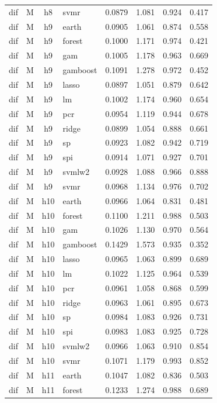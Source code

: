 \begin{ThreePartTable}
\begin{longtable}[t]{llclcccc}
dif & M & h8 & svmr & 0.0879 & 1.081 & 0.924 & 0.417\\
\addlinespace
dif & M & h9 & earth & 0.0905 & 1.061 & 0.874 & 0.558\\
dif & M & h9 & forest & 0.1000 & 1.171 & 0.974 & 0.421\\
dif & M & h9 & gam & 0.1005 & 1.178 & 0.963 & 0.669\\
dif & M & h9 & gamboost & 0.1091 & 1.278 & 0.972 & 0.452\\
dif & M & h9 & lasso & 0.0897 & 1.051 & 0.879 & 0.642\\
dif & M & h9 & lm & 0.1002 & 1.174 & 0.960 & 0.654\\
dif & M & h9 & pcr & 0.0954 & 1.119 & 0.944 & 0.678\\
dif & M & h9 & ridge & 0.0899 & 1.054 & 0.888 & 0.661\\
dif & M & h9 & sp & 0.0923 & 1.082 & 0.942 & 0.719\\
dif & M & h9 & spi & 0.0914 & 1.071 & 0.927 & 0.701\\
dif & M & h9 & svmlw2 & 0.0928 & 1.088 & 0.966 & 0.888\\
dif & M & h9 & svmr & 0.0968 & 1.134 & 0.976 & 0.702\\
\addlinespace
dif & M & h10 & earth & 0.0966 & 1.064 & 0.831 & 0.481\\
dif & M & h10 & forest & 0.1100 & 1.211 & 0.988 & 0.503\\
dif & M & h10 & gam & 0.1026 & 1.130 & 0.970 & 0.564\\
dif & M & h10 & gamboost & 0.1429 & 1.573 & 0.935 & 0.352\\
dif & M & h10 & lasso & 0.0965 & 1.063 & 0.899 & 0.689\\
dif & M & h10 & lm & 0.1022 & 1.125 & 0.964 & 0.539\\
dif & M & h10 & pcr & 0.0961 & 1.058 & 0.868 & 0.599\\
dif & M & h10 & ridge & 0.0963 & 1.061 & 0.895 & 0.673\\
dif & M & h10 & sp & 0.0984 & 1.083 & 0.926 & 0.731\\
dif & M & h10 & spi & 0.0983 & 1.083 & 0.925 & 0.728\\
dif & M & h10 & svmlw2 & 0.0966 & 1.063 & 0.910 & 0.854\\
dif & M & h10 & svmr & 0.1071 & 1.179 & 0.993 & 0.852\\
\addlinespace
dif & M & h11 & earth & 0.1047 & 1.082 & 0.836 & 0.503\\
dif & M & h11 & forest & 0.1233 & 1.274 & 0.988 & 0.689\\

\end{longtable}
\end{ThreePartTable}
